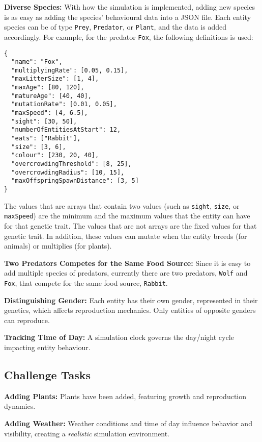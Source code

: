 \documentclass[12pt, a4paper]{scrartcl}
\begin{document}
\begin{multicols}{2}
  \noindent \textbf{Diverse Species:} With how the simulation is implemented, adding new species is as easy as adding 
  the species' behavioural data into a JSON file. Each entity species can be of type \verb|Prey|, \verb|Predator|,
  or \verb|Plant|, and the data is added accordingly. For example, for the predator \verb|Fox|, the following definitions
  is used:
  \begin{verbatim}
{
  "name": "Fox",
  "multiplyingRate": [0.05, 0.15],
  "maxLitterSize": [1, 4],
  "maxAge": [80, 120],
  "matureAge": [40, 40],
  "mutationRate": [0.01, 0.05],
  "maxSpeed": [4, 6.5],
  "sight": [30, 50],
  "numberOfEntitiesAtStart": 12,
  "eats": ["Rabbit"],
  "size": [3, 6],
  "colour": [230, 20, 40],
  "overcrowdingThreshold": [8, 25],
  "overcrowdingRadius": [10, 15],
  "maxOffspringSpawnDistance": [3, 5]
}
  \end{verbatim}
  \noindent The values that are arrays that contain two values (such as \verb|sight|, \verb|size|, or \verb|maxSpeed|)
  are the minimum and the maximum values that the entity can have for that genetic trait. The values that are not
  arrays are the fixed values for that genetic trait. In addition, these values can mutate when the entity breeds
  (for animals) or multiplies (for plants). 


  
  \noindent \textbf{Two Predators Competes for the Same Food Source:}
  Since it is easy to add multiple species of predators, currently there are two predators, \verb|Wolf| and \verb|Fox|,
  that compete for the same food source, \verb|Rabbit|.
  
  \noindent \textbf{Distinguishing Gender:} Each entity has their own gender, represented in their genetics,
  which affects reproduction mechanics. Only entities of opposite genders can reproduce.
  
  \noindent \textbf{Tracking Time of Day:} A simulation clock governs the day/night cycle impacting entity behaviour.

\subsection{Challenge Tasks}

  \noindent \textbf{Adding Plants:} Plants have been added, featuring growth and reproduction dynamics.
  
  \noindent \textbf{Adding Weather:} Weather conditions and time of day influence behavior and visibility,
  creating a \textit{realistic} simulation environment.
  

\end{multicols}
\end{document}
